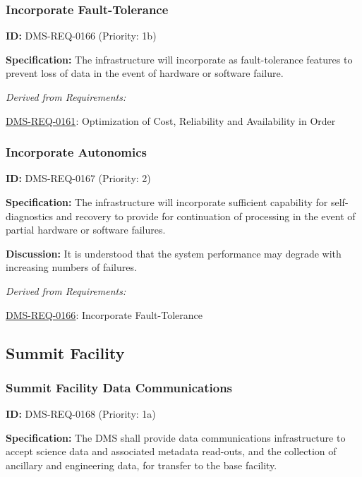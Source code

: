 \documentclass[SE,toc,lsstdraft]{lsstdoc}
\begin{document}
\subsubsection{Incorporate Fault-Tolerance}

\label{DMS-REQ-0166}
\textbf{ID:} DMS-REQ-0166 (Priority: 1b)

\textbf{Specification: }The infrastructure will incorporate as fault-tolerance features to prevent loss of data in the event of hardware or software failure.

\emph{Derived from Requirements:}

\hyperref[DMS-REQ-0161]{DMS-REQ-0161}:
Optimization of Cost, Reliability and Availability in Order \newline

\subsubsection{Incorporate Autonomics}

\label{DMS-REQ-0167}
\textbf{ID:} DMS-REQ-0167 (Priority: 2)

\textbf{Specification:} The infrastructure will incorporate sufficient capability for self-diagnostics and recovery to provide for continuation of processing in the event of partial hardware or software failures.

\textbf{Discussion: }It is understood that the system performance may degrade with increasing numbers of failures.

\emph{Derived from Requirements:}

\hyperref[DMS-REQ-0166]{DMS-REQ-0166}:
Incorporate Fault-Tolerance \newline

\subsection{Summit Facility}

\subsubsection{Summit Facility Data Communications}

\label{DMS-REQ-0168}
\textbf{ID:} DMS-REQ-0168 (Priority: 1a)

\textbf{Specification:} The DMS shall provide data communications infrastructure to accept science data and associated metadata read-outs, and the collection of ancillary and engineering data, for transfer to the base facility.
\end{document}
